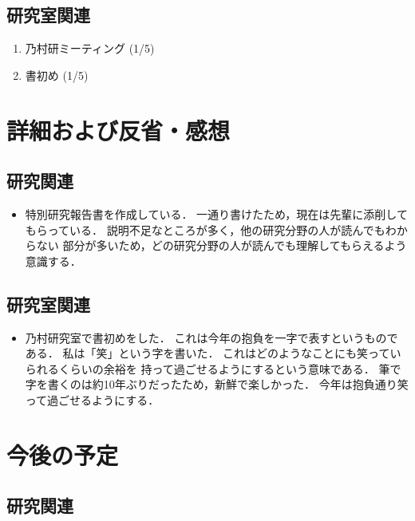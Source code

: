 \documentclass[fleqn, 14pt]{extarticle}
\begin{document}
\subsection{研究室関連}
\label{sec-2-2}
\begin{enumerate}
\item 乃村研ミーティング 
\hfill
\label{enum-lab1}
(1/5)
\item 書初め
\hfill
\label{enum-lab3}
(1/5)
\end{enumerate}


\section{詳細および反省・感想}
\label{sec-3}
\subsection{研究関連}
\label{sec-3-1}

\begin{itemize}
\item[(\ref{enum-1-E})]
    特別研究報告書を作成している．
    一通り書けたため，現在は先輩に添削してもらっている．
    説明不足なところが多く，他の研究分野の人が読んでもわからない
    部分が多いため，どの研究分野の人が読んでも理解してもらえるよう
    意識する．
    
\end{itemize}

\subsection{研究室関連}
\label{sec3-2}
\begin{itemize}
    \item[(\ref{enum-lab3})]
        乃村研究室で書初めをした．
        これは今年の抱負を一字で表すというものである．
        私は「笑」という字を書いた．
        これはどのようなことにも笑っていられるくらいの余裕を
        持って過ごせるようにするという意味である．
        筆で字を書くのは約10年ぶりだったため，新鮮で楽しかった．
        今年は抱負通り笑って過ごせるようにする．
\end{itemize}
\section{今後の予定}
\label{sec-4}
\subsection{研究関連}
\label{sec-4-1}
\end{document}
